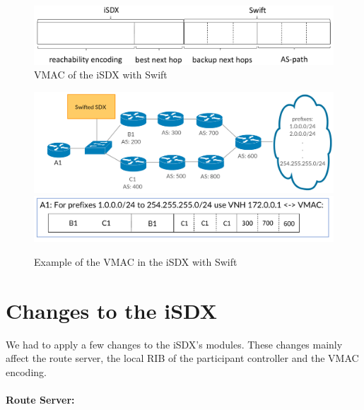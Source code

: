 \begin{figure}[h]
\center
\includegraphics[scale = 0.5]{Figures/design_vmac3_cropped.pdf}
\caption{VMAC of the iSDX with Swift}
\end{figure}

\begin{figure}[h]
\center
\includegraphics[scale = 0.24]{Figures/design_vmac_topology.pdf}
\includegraphics[scale = 0.35]{Figures/vmac_picture_cropped.pdf}
\caption{Example of the VMAC in the iSDX with Swift}
\label{fig:sixdsvmac}
\end{figure}

\section{\label{chapter4:Changes_to_the_iSDX}Changes to the iSDX}

We had to apply a few changes to the iSDX's modules. These changes mainly affect the route server, the local RIB of the participant controller and the VMAC encoding. 

\paragraph{\label{chapter4:Changes to the iSDX:route server}Route Server:}

